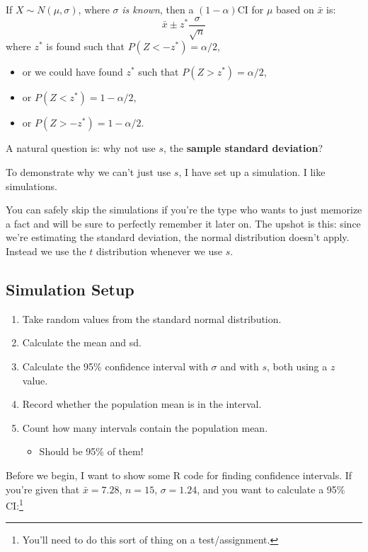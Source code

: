 \documentclass[
  letterpaper,
  DIV=11,
  numbers=noendperiod]{scrreprt}
\providecommand{\tightlist}{%
  \setlength{\itemsep}{0pt}\setlength{\parskip}{0pt}}\usepackage{longtable,booktabs,array}
\begin{document}
If \(X\sim N(\mu,\sigma)\), where \(\sigma\) \emph{is known}, then a
\((1-\alpha)\)CI for \(\mu\) based on \(\bar x\) is: \[
\bar x \pm z^*\frac{\sigma}{\sqrt{n}}
\] where \(z^*\) is found such that \(P(Z < -z^*) = \alpha/2\),

\begin{itemize}
\tightlist
\item
  or we could have found \(z^*\) such that \(P(Z > z^*) = \alpha/2\),
\item
  or \(P(Z < z^*) = 1 - \alpha/2\),
\item
  or \(P(Z > -z^*) = 1 - \alpha/2\).
\end{itemize}

A natural question is: why not use \(s\), the \textbf{sample standard
deviation}?

To demonstrate why we can't just use \(s\), I have set up a simulation.
I like simulations.

You can safely skip the simulations if you're the type who wants to just
memorize a fact and will be sure to perfectly remember it later on. The
upshot is this: since we're estimating the standard deviation, the
normal distribution doesn't apply. Instead we use the \(t\) distribution
whenever we use \(s\).

\hypertarget{simulation-setup}{%
\subsection{Simulation Setup}\label{simulation-setup}}

\begin{enumerate}
\def\labelenumi{\arabic{enumi}.}
\tightlist
\item
  Take random values from the standard normal distribution.
\item
  Calculate the mean and sd.
\item
  Calculate the 95\% confidence interval with \(\sigma\) and with \(s\),
  both using a \(z\) value.
\item
  Record whether the population mean is in the interval.
\item
  Count how many intervals contain the population mean.

  \begin{itemize}
  \tightlist
  \item
    Should be 95\% of them!
  \end{itemize}
\end{enumerate}

Before we begin, I want to show some R code for finding confidence
intervals. If you're given that \(\bar x = 7.28\), \(n=15\),
\(\sigma = 1.24\), and you want to calculate a 95\% CI:\footnote{You'll
  need to do this sort of thing on a test/assignment.}
\end{document}

